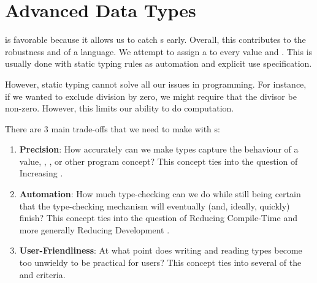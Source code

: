 \section{Advanced Data Types}\label{sec:Advanced_Data_Types}
 is favorable because it allows us to catch s early.
Overall, this contributes to the robustness and  of a language.
We attempt to assign a  to every value and .
This is usually done with static typing rules as automation and explicit use specification.

However, static typing cannot solve all our issues in programming.
For instance, if we wanted to exclude division by zero, we might require that the divisor be non-zero.
However, this limits our ability to do computation.

There are 3 main trade-offs that we need to make with s:
\begin{enumerate}[noitemsep]
\item \textbf{Precision}: How accurately can we make types capture the behaviour of a value, , , or other program concept?
  This concept ties into the question of Increasing .
\item \textbf{Automation}: How much type-checking can we do while still being certain that the type-checking mechanism will eventually (and, ideally, quickly) finish?
  This concept ties into the question of Reducing Compile-Time  and more generally Reducing Development .
\item \textbf{User-Friendliness}: At what point does writing and reading types become too unwieldy to be practical for users?
  This concept ties into several of the  and  criteria.
\end{enumerate}

